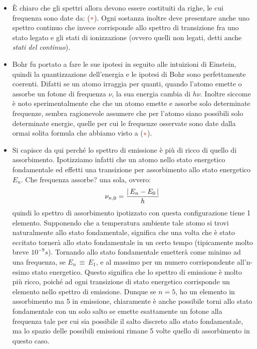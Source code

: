 \begin{itemize}

	\item È chiaro che gli spettri allora devono essere costituiti da righe, le cui frequenza sono date da: ($\textcolor{red}{*}$). Ogni sostanza inoltre deve presentare anche uno spettro continuo che invece corrisponde allo spettro di transizione fra uno stato legato e gli stati di ionizzazione (ovvero quelli non legati, detti anche \textit{stati del continuo}).
		
	\item Bohr fu portato a fare le sue ipotesi in seguito alle intuizioni di Einstein, quindi la quantizzazione dell'energia e le ipotesi di Bohr sono perfettamente coerenti. Difatti se un atomo irraggia per quanti, quando l'atomo emette o assorbe un fotone di frequenza $\nu$, la sua energia cambia di $h\nu$. Inoltre siccome è noto sperimentalmente che che un atomo emette e assorbe solo determinate frequenze, sembra ragionevole assumere che per l'atomo siano possibili solo determinate energie, quelle per cui le frequenze osservate sono date dalla ormai solita formula che abbiamo visto a ($\textcolor{red}{*}$).
	
	\item Si capisce da qui perché lo spettro di emissione è più di ricco di quello di assorbimento. Ipotizziamo infatti che un atomo nello stato energetico fondamentale ed effetti una transizione per assorbimento allo stato energetico $E_n$. Che frequenza assorbe? una sola, ovvero:
	\begin{align*}
		\nu_{n,0} = \frac{\abs{\, E_n - E_0 \,}}{h} 
	\end{align*}
		quindi lo spettro di assorbimento ipotizzato con questa configurazione tiene 1 elemento. Supponendo che a temperatura ambiente tale atomo si trovi naturalmente allo stato fondamentale, significa che una volta che è stato eccitato tornerà allo stato fondamentale in un certo tempo (tipicamente molto breve $10^{-9} s$). Tornando allo stato fondamentale emetterà come minimo ad una frequenza, se $E_n \, \equiv \, E_1$, e al massimo per un numero corrispondente all'n-esimo stato energetico. Questo significa che lo spettro di emissione è molto più ricco, poiché ad ogni transizione di stato energetico corrisponde un elemento nello spettro di emissione. Dunque se $n = 5$, ho un elemento in assorbimento ma 5 in emissione, chiaramente è anche possibile torni allo stato fondamentale con un solo salto se emette esattamente un fotone alla frequenza tale per cui sia possibile il salto discreto allo stato fondamentale, ma lo spazio delle possibili emissioni rimane 5 volte quello di assorbimento in questo caso.


\end{itemize}
